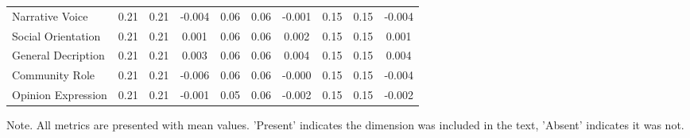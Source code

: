 \begin{table}
\begin{tabular}{lccccccccc}
Narrative Voice & 0.21 & 0.21 & -0.004 & 0.06 & 0.06 & -0.001 & 0.15 & 0.15 & -0.004 \\
Social Orientation & 0.21 & 0.21 & 0.001 & 0.06 & 0.06 & 0.002 & 0.15 & 0.15 & 0.001 \\
General Decription & 0.21 & 0.21 & 0.003 & 0.06 & 0.06 & 0.004 & 0.15 & 0.15 & 0.004 \\
Community Role & 0.21 & 0.21 & -0.006 & 0.06 & 0.06 & -0.000 & 0.15 & 0.15 & -0.004 \\
Opinion Expression & 0.21 & 0.21 & -0.001 & 0.05 & 0.06 & -0.002 & 0.15 & 0.15 & -0.002 \\
\hline
\end{tabular}
\begin{tablenotes}
\small
\item Note. All metrics are presented with mean values. 'Present' indicates the dimension was included in the text, 'Absent' indicates it was not.
\end{tablenotes}
\end{table}